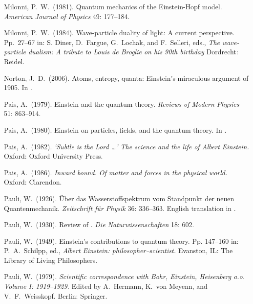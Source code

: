 \documentclass{elsart}
\begin{document}
{\begin{thebibliography}{}
  Milonni, P.\ W.\ (1981). Quantum mechanics of the Einstein-Hopf model. {\it American Journal of Physics} 49: 177--184.

  Milonni, P.\ W.\ (1984). Wave-particle duality of light: A current perspective. Pp.\ 27--67 in:  S. Diner, D.\ Fargue, G.\ Lochak, and F.\ Selleri, eds., {\it The wave-particle dualism: A tribute to Louis de Broglie on his 90th birthday} Dordrecht: Reidel.

 Norton, J.\ D.\ (2006). Atoms, entropy, quanta: Einstein's miraculous argument of 1905. In \citep[71--100]{Janssen 2006}.


 Pais, A.\ (1979). Einstein and the quantum theory. {\it Reviews of Modern Physics} 51: 863--914.

 Pais, A.\ (1980). Einstein on particles, fields, and the quantum theory. In \citep[pp.\ 197--251]{Woolf 1980}.

 Pais, A.\ (1982). {\it `Subtle is the Lord \ldots' The science and the life of Albert Einstein.} Oxford: Oxford University Press.

 Pais, A.\ (1986). {\it Inward bound. Of matter and forces in the physical world.} Oxford: Clarendon.

 Pauli, W.\ (1926). \"Uber das Wasserstoffspektrum vom Standpunkt der neuen Quantenmechanik.  {\it Zeitschrift f\"ur Physik} 36: 336--363. English translation in \citep[pp.\ 387--415]{Van der Waerden}.

 Pauli, W.\ (1930). Review of \citep{Born and Jordan 1930}. {\it Die Naturwissenschaften} 18: 602.

 Pauli, W.\ (1949). Einstein's contributions to quantum theory. Pp. 147--160 in: P.\ A.\ Schilpp, ed., {\it Albert Einstein: philosopher--scientist.} Evanston, IL: The Library of Living Philosophers.

 Pauli, W.\ (1979). {\it Scientific correspondence with Bohr, Einstein, Heisenberg a.o. Volume I: 1919--1929.} Edited by A.\ Hermann, K.\ von Meyenn, and  V.\ F.\ Weisskopf. Berlin: Springer.


\end{thebibliography}}
\end{document}
